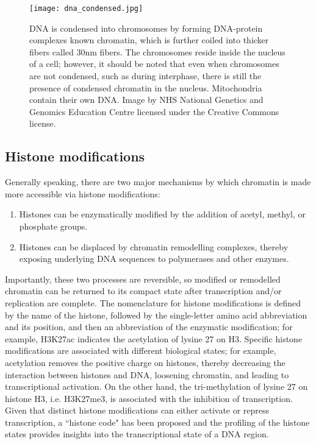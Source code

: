\begin{figure}[!ht]
   \centering
   \texttt{[image: dna\_condensed.jpg]}
   \caption[DNA packaging]{DNA is condensed into chromosomes by forming DNA-protein complexes known chromatin, which is further coiled into thicker fibers called 30nm fibers. The chromosomes reside inside the nucleus of a cell; however, it should be noted that even when chromosomes are not condensed, such as during interphase, there is still the presence of condensed chromatin in the nucleus. Mitochondria contain their own DNA. Image by NHS National Genetics and Genomics Education Centre licensed under the Creative Commons license.}
   \label{fig:dna_condensed}
\end{figure}

\subsection{Histone modifications}

Generally speaking, there are two major mechanisms by which chromatin is made more accessible via histone modifications:

\begin{enumerate}
   \item Histones can be enzymatically modified by the addition of acetyl, methyl, or phosphate groups.
   \item Histones can be displaced by chromatin remodelling complexes, thereby exposing underlying DNA sequences to polymerases and other enzymes.
\end{enumerate}

Importantly, these two processes are reversible, so modified or remodelled chromatin can be returned to its compact state after transcription and/or replication are complete. The nomenclature for histone modifications is defined by the name of the histone, followed by the single-letter amino acid abbreviation and its position, and then an abbreviation of the enzymatic modification; for example, H3K27ac indicates the acetylation of lysine 27 on H3. Specific histone modifications are associated with different biological states; for example, acetylation removes the positive charge on histones, thereby decreasing the interaction between histones and DNA, loosening chromatin, and leading to transcriptional activation. On the other hand, the tri-methylation of lysine 27 on histone H3, i.e. H3K27me3, is associated with the inhibition of transcription\cite{pmid21652639}. Given that distinct histone modifications can either activate or repress transcription, a ``histone code" has been proposed\cite{pmid11498575} and the profiling of the histone states provides insights into the transcriptional state of a DNA region.

